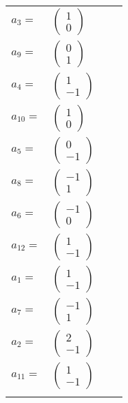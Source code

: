 \documentclass[1p]{elsarticle_modified}
\theoremstyle{definition}
\begin{document}
\begin{tabular}{m{7pt} m{180pt} m{7pt} m{180pt} }
\flushright $a_{3}=$&$\begin{pmatrix}1\\0\end{pmatrix}$ \\
\flushright $a_{9}=$&$\begin{pmatrix}0\\1\end{pmatrix}$ \\
\flushright $a_{4}=$&$\begin{pmatrix}1\\-1\end{pmatrix}$ \\
\flushright $a_{10}=$&$\begin{pmatrix}1\\0\end{pmatrix}$ \\
\flushright $a_{5}=$&$\begin{pmatrix}0\\-1\end{pmatrix}$ \\
\flushright $a_{8}=$&$\begin{pmatrix}-1\\1\end{pmatrix}$ \\
\flushright $a_{6}=$&$\begin{pmatrix}-1\\0\end{pmatrix}$ \\
\flushright $a_{12}=$&$\begin{pmatrix}1\\-1\end{pmatrix}$ \\
\flushright $a_{1}=$&$\begin{pmatrix}1\\-1\end{pmatrix}$ \\
\flushright $a_{7}=$&$\begin{pmatrix}-1\\1\end{pmatrix}$ \\
\flushright $a_{2}=$&$\begin{pmatrix}2\\-1\end{pmatrix}$ \\
\flushright $a_{11}=$&$\begin{pmatrix}1\\-1\end{pmatrix}$\\&\end{tabular}
\end{document}
